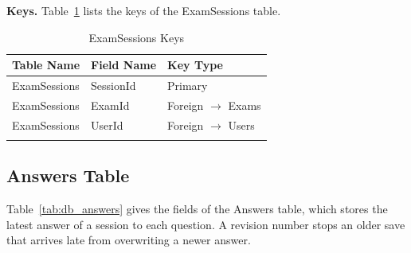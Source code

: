 \par\ifdim\dimexpr\pagegoal-\pagetotal\relax<180pt\newpage\fi
\noindent\textbf{Keys.} Table~\ref{tab:keys_examsessions} lists the keys of the ExamSessions table.

{\small
\begin{longtable}{>{\raggedright\arraybackslash}p{4.0cm}>{\raggedright\arraybackslash}p{4.6cm}>{\raggedright\arraybackslash}p{4.6cm}}
\caption{ExamSessions Keys}\label{tab:keys_examsessions}\\
\hline\hline
\textbf{Table Name} & \textbf{Field Name} & \textbf{Key Type} \\ \hline
\endfirsthead
\hline\hline
\endlastfoot
ExamSessions & SessionId & Primary \\*
ExamSessions & ExamId & Foreign $\rightarrow$ Exams \\*
ExamSessions & UserId & Foreign $\rightarrow$ Users \\*
\end{longtable}
}

\par\ifdim\dimexpr\pagegoal-\pagetotal\relax<376pt\newpage\fi
\subsection{Answers Table}
Table~\ref{tab:db_answers} gives the fields of the Answers table, which stores the latest answer of a session to each question. A revision number stops an older save that arrives late from overwriting a newer answer.

